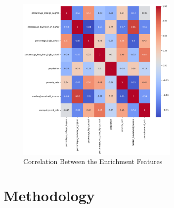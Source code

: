 \begin{figure}[h]
    \centering
    \includegraphics[width=0.7\textwidth]{images/CH03_Enrichment_Correlation.png}
    \caption{Correlation Between the Enrichment Features}
    \label{fig:CH03_Enrichment_Correlation}
\end{figure}

\section{Methodology}\label{sec:Methodology}